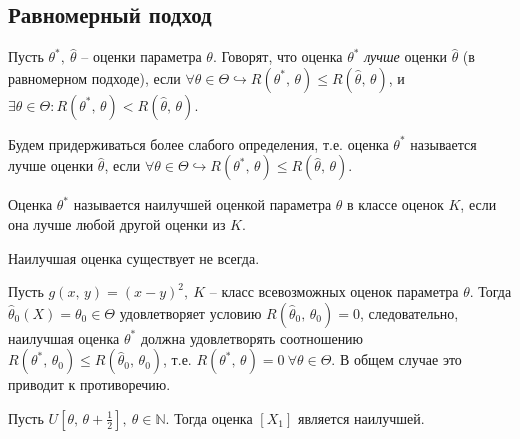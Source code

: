     \subsection{Равномерный подход}
    \begin{definition}
    Пусть $\displaystyle \theta ^{*},\ \hat{\theta }$ -- оценки параметра $\displaystyle \theta $. Говорят, что оценка $\displaystyle \theta ^{*}$ \textit{лучше} оценки $\displaystyle \hat{\theta }$ (в равномерном подходе), если $\displaystyle \forall \theta \in \Theta \hookrightarrow R\left( \theta ^{*},\, \theta \right) \leqslant R(\hat{\theta },\, \theta )$, и $\displaystyle \exists \theta \in \Theta :R\left( \theta ^{*},\, \theta \right) < R(\hat{\theta },\, \theta )$.
    \end{definition}
    \begin{note}
    Будем придерживаться более слабого определения, т.е. оценка $\displaystyle \theta ^{*}$ называется лучше оценки $\displaystyle \hat{\theta }$, если $\displaystyle \forall \theta \in \Theta \hookrightarrow R\left( \theta ^{*},\, \theta \right) \leqslant R(\hat{\theta },\, \theta )$.
    \end{note}
    \begin{definition}
    Оценка $\displaystyle \theta ^{*}$ называется наилучшей оценкой параметра $\displaystyle \theta $ в классе оценок $\displaystyle K$, если она лучше любой другой оценки из $\displaystyle K$.
    \end{definition}
    \begin{note}
    Наилучшая оценка существует не всегда.
    \end{note}
    \begin{example}
    Пусть $\displaystyle g(x,\, y) =( x-y)^{2},\ K$ -- класс всевозможных оценок параметра $\displaystyle \theta $. Тогда $\displaystyle \hat{\theta }_{0}( X) =\theta _{0} \in \Theta $ удовлетворяет условию $\displaystyle R(\hat{\theta }_{0},\, \theta _{0}) =0$, следовательно, наилучшая оценка $\displaystyle \theta ^{*}$ должна удовлетворять соотношению $\displaystyle R\left( \theta ^{*},\, \theta _{0}\right) \leqslant R(\hat{\theta }_{0},\, \theta _{0})$, т.е. $\displaystyle R\left( \theta ^{*},\, \theta \right) =0\ \forall \theta \in \Theta $. В общем случае это приводит к противоречию.
    \end{example}
    \begin{example}
    Пусть $\displaystyle U\left[ \theta,\, \theta +\frac{1}{2}\right],\ \theta \in \mathbb{N}$. Тогда оценка $\displaystyle [ X_{1}]$ является наилучшей.
    \end{example}
